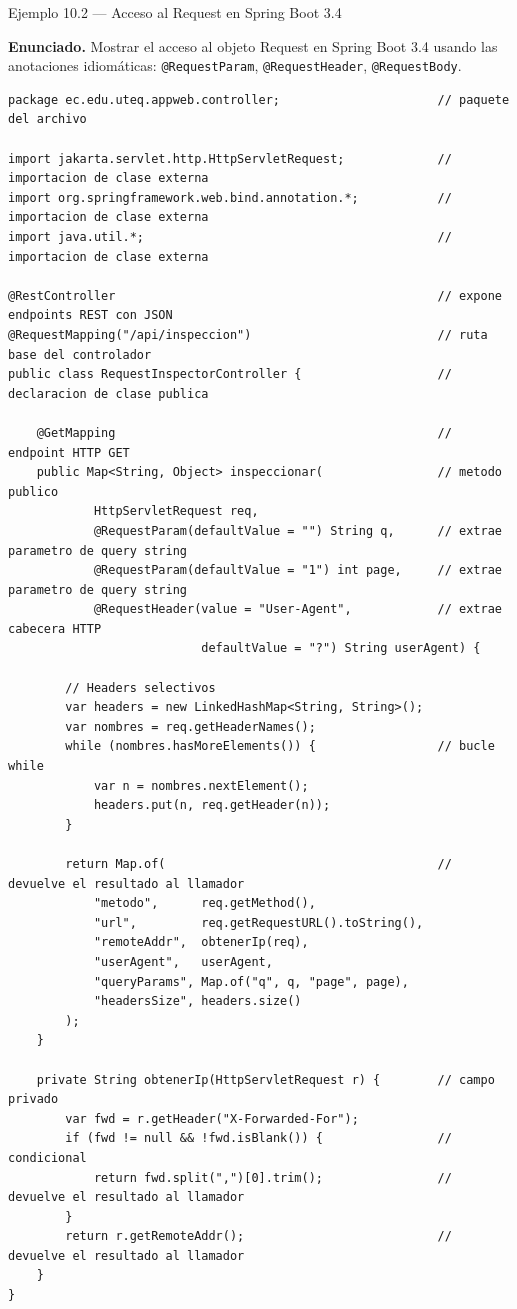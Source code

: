 \documentclass[11pt,a4paper,openany]{book}
\begin{document}
\begin{cajaejemplo}{Ejemplo 10.2 --- Acceso al Request en Spring Boot 3.4}

\textbf{Enunciado.} Mostrar el acceso al objeto Request en Spring Boot 3.4 usando las anotaciones idiomáticas: \texttt{@RequestParam}, \texttt{@RequestHeader}, \texttt{@RequestBody}.

\begin{lstlisting}[style=java,caption={RequestInspectorController.java},label=lst:10.5]
package ec.edu.uteq.appweb.controller;                      // paquete del archivo

import jakarta.servlet.http.HttpServletRequest;             // importacion de clase externa
import org.springframework.web.bind.annotation.*;           // importacion de clase externa
import java.util.*;                                         // importacion de clase externa

@RestController                                             // expone endpoints REST con JSON
@RequestMapping("/api/inspeccion")                          // ruta base del controlador
public class RequestInspectorController {                   // declaracion de clase publica

    @GetMapping                                             // endpoint HTTP GET
    public Map<String, Object> inspeccionar(                // metodo publico
            HttpServletRequest req,
            @RequestParam(defaultValue = "") String q,      // extrae parametro de query string
            @RequestParam(defaultValue = "1") int page,     // extrae parametro de query string
            @RequestHeader(value = "User-Agent",            // extrae cabecera HTTP
                           defaultValue = "?") String userAgent) {

        // Headers selectivos
        var headers = new LinkedHashMap<String, String>();
        var nombres = req.getHeaderNames();
        while (nombres.hasMoreElements()) {                 // bucle while
            var n = nombres.nextElement();
            headers.put(n, req.getHeader(n));
        }

        return Map.of(                                      // devuelve el resultado al llamador
            "metodo",      req.getMethod(),
            "url",         req.getRequestURL().toString(),
            "remoteAddr",  obtenerIp(req),
            "userAgent",   userAgent,
            "queryParams", Map.of("q", q, "page", page),
            "headersSize", headers.size()
        );
    }

    private String obtenerIp(HttpServletRequest r) {        // campo privado
        var fwd = r.getHeader("X-Forwarded-For");
        if (fwd != null && !fwd.isBlank()) {                // condicional
            return fwd.split(",")[0].trim();                // devuelve el resultado al llamador
        }
        return r.getRemoteAddr();                           // devuelve el resultado al llamador
    }
}
\end{lstlisting}
\end{cajaejemplo}
\end{document}
